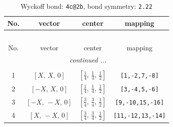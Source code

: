 \documentclass[fleqn,8pt]{jsarticle}
\begin{document}
\renewcommand{\arraystretch}{1.2}
\begin{longtable}{cccc}
\caption{Wyckoff bond: {\tt 4c@2b}, bond symmetry: {\tt 2.22}}
 \\
 \hline \hline
No. & vector & center & mapping \\ \hline \endfirsthead

\multicolumn{3}{l}{\tablename\ \thetable{}} \\
 \hline \hline
No. & vector & center & mapping \\ \hline \endhead

 \hline \hline
\multicolumn{3}{r}{\footnotesize\it continued ...} \\ \endfoot

 \hline \hline
\multicolumn{3}{r}{} \\ \endlastfoot

1 & $\left[ X,\, X,\, 0 \right]$ & $\left[ \frac{1}{4},\, \frac{1}{4},\, \frac{1}{2} \right]$ & {\tt [1,-2,7,-8]} \\ \hline
2 & $\left[ - X,\, X,\, 0 \right]$ & $\left[ \frac{1}{4},\, \frac{1}{4},\, \frac{1}{2} \right]$ & {\tt [3,-4,5,-6]} \\ \hline
3 & $\left[ - X,\, - X,\, 0 \right]$ & $\left[ \frac{3}{4},\, \frac{3}{4},\, \frac{1}{2} \right]$ & {\tt [9,-10,15,-16]} \\ \hline
4 & $\left[ X,\, - X,\, 0 \right]$ & $\left[ \frac{3}{4},\, \frac{3}{4},\, \frac{1}{2} \right]$ & {\tt [11,-12,13,-14]} \\
\end{longtable}
\renewcommand{\arraystretch}{1.2}
\end{document}
